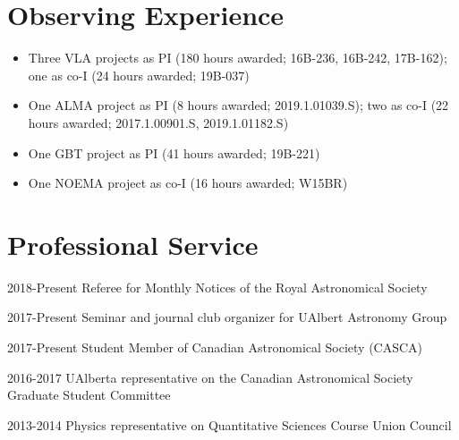 \documentclass[letterpaper,11pt]{article}
\newlength{\mainindent} \setlength{\mainindent}{12pt}
\newlength{\contentindent} \setlength{\contentindent}{19ex}
\newenvironment{datelist}{
  \begingroup
  \raggedright
  \begin{description}[labelindent=\mainindent,leftmargin=\contentindent,
      style=sameline,font=\normalfont,topsep=0pt,partopsep=0pt,parsep=0pt,
      itemsep=4pt]
}{
  \end{description}
  \endgroup
}
\begin{document}


\section*{Observing Experience}
\begin{itemize}
\item Three VLA projects as PI (180 hours awarded; 16B-236, 16B-242, 17B-162); one as co-I (24 hours awarded; 19B-037)
\item One ALMA project as PI (8 hours awarded; 2019.1.01039.S); two as co-I (22 hours awarded; 2017.1.00901.S, 2019.1.01182.S)
\item One GBT project as PI (41 hours awarded; 19B-221)
\item One NOEMA project as co-I (16 hours awarded; W15BR)
\end{itemize}

\section*{Professional Service}
\begin{datelist}

\item[2018-Present] Referee for Monthly Notices of the Royal Astronomical Society
\item[2017-Present] Seminar and journal club organizer for UAlbert Astronomy Group
\item[2017-Present] Student Member of Canadian Astronomical Society (CASCA)
\item[2016-2017] UAlberta representative on the Canadian Astronomical Society Graduate Student Committee
\item[2013-2014] Physics representative on Quantitative Sciences Course Union Council

\end{datelist}
\end{document}
